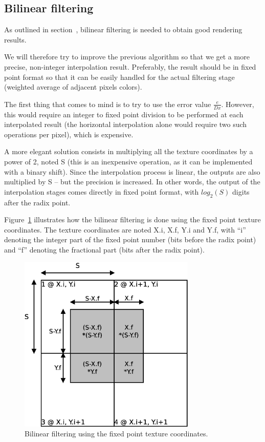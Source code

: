 \documentclass[a4paper,11pt]{kthesis}
\begin{document}
\subsection{Bilinear filtering}
As outlined in section~\label{sec:tm}, bilinear filtering is needed to obtain good rendering results.

We will therefore try to improve the previous algorithm so that we get a more precise, non-integer interpolation result. Preferably, the result should be in fixed point format so that it can be easily handled for the actual filtering stage (weighted average of adjacent pixels colors).

The first thing that comes to mind is to try to use the error value $\frac{e}{Dx}$. However, this would require an integer to fixed point division to be performed at each interpolated result (the horizontal interpolation alone would require two such operations per pixel), which is expensive.

A more elegant solution consists in multiplying all the texture coordinates by a power of 2, noted S (this is an inexpensive operation, as it can be implemented with a binary shift). Since the interpolation process is linear, the outputs are also multiplied by S -- but the precision is increased. In other words, the output of the interpolation stages comes directly in fixed point format, with $log_{2}(S)$ digits after the radix point.

Figure~\ref{fig:filtfromfp} illustrates how the bilinear filtering is done using the fixed point texture coordinates. The texture coordinates are noted X.i, X.f, Y.i and Y.f, with ``i'' denoting the integer part of the fixed point number (bits before the radix point) and ``f'' denoting the fractional part (bits after the radix point).

\begin{figure}[htp]
\centering
\includegraphics[height=85mm]{filtfromfp.eps}
\caption{Bilinear filtering using the fixed point texture coordinates.}
\label{fig:filtfromfp}
\end{figure}
\end{document}
